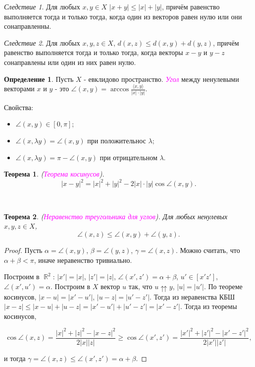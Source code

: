 \documentclass[a4paper,100pt]{article}
\theoremstyle{indented}
\newtheorem{theorem}{Теорема}
\theoremstyle{definition}
\newtheorem{defn}{Определение}
\theoremstyle{remark}
\newtheorem{cons}{Следствие}
\DeclareMathOperator{\RR}{\mathbb{R}}
\begin{document}
\begin{cons}
    Для любых $x, y\in X$ $|x+y|\leq |x|+|y|$, причём равенство выполняется тогда и только тогда, когда один из векторов равен нулю или они сонаправленны.
\end{cons}

\begin{cons}
    Для любых $x, y, z\in X$, $d(x, z)\leq d(x, y)+d(y, z)$, причём равенство выполняется тогда и только тогда, когда векторы $x-y$ и $y-z$ сонаправлены или один из них равен нулю.
\end{cons}

\begin{defn}
    Пусть $X$ - евклидово пространство. \textit{\textcolor{magenta}{\hypertarget{s58}{Угол}}} между ненулевыми векторами $x$ и $y$ - это $\angle (x, y) = \arccos \frac{\langle x, y \rangle}{|x|\cdot |y|}$.
\end{defn}

Свойства:

\begin{itemize}
    \item $\angle (x, y) \in [0, \pi]$; 
    \item $\angle (x, \lambda y) = \angle (x, y)$ при положительнос $\lambda$; 
    \item $\angle (x, \lambda y) = \pi - \angle(x, y)$ при отрицательном $\lambda$. 
\end{itemize}

\begin{theorem}
    (\textit{\textcolor{magenta}{\hypertarget{s59}{Теорема косинусов}}}). 
    \[
        |x-y|^2 = |x|^2+|y|^2-2|x|\cdot |y| \cos \angle (x, y).
    \]
\end{theorem} \ 

\begin{theorem}
    (\textit{\textcolor{magenta}{\hypertarget{s60}{Неравенство треугольника для углов}}}). Для любых ненулевых $x, y, z\in X$, 
    \[
        \angle(x, z)\leq \angle (x, y)+ \angle (y, z). 
    \]
\end{theorem}

\begin{proof}
    Пусть $\alpha = \angle(x, y)$, $\beta = \angle(y, z)$, $\gamma = \angle(x, z)$. Можно считать, что $\alpha+ \beta < \pi$, иначе неравенство тривиально. \ 

    Построим в $\RR^2$: $|x'| = |x|$, $|z'| = |z|$, $\angle(x', z') = \alpha+ \beta$, $u' \in [x'z']$, $\angle (x', u') = \alpha$. Построим в $X$ вектор $u$ так, что $u \upuparrows y$, $|u| = |u'|$. По теореме косинусов, $|x-u| = |x'-u'|$, $|u-z| = |u'-z'|$. Тогда из неравенства КБШ $|x-z| \leq |x-u|+|u-z| = |x' - u'|+|u' - z'| = |x' - z'|$. Тогда из теоремы косинусов, 

    \[
        \cos \angle (x, z) = \frac{|x|^2+|z|^2-|x-z|^2}{2|x||z|} \geq \cos \angle(x', z') = \frac{|x'|^2+|z'|^2-|x'-z'|^2}{2|x'||z'|},  
    \]

    и тогда $\gamma = \angle (x, z) \leq \angle (x', z') = \alpha + \beta$. 
\end{proof}
\end{document}
